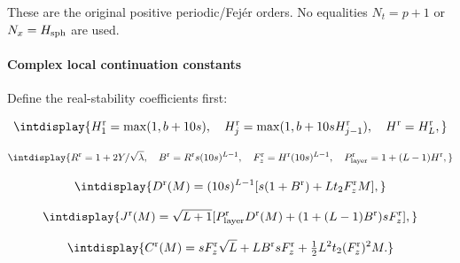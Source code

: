 
These are the original positive periodic/Fejér orders. No equalities \(N_t=p+1\) or \(N_x=H_{\rm sph}\) are used.


\paragraph{Complex local continuation constants}
\label{int:setup-orders-detail-7}
\mbox{}\par\smallskip


Define the real-stability coefficients first:


\begingroup\renewcommand{\theHequation}{intdisplay.251}
\begin{equation*}
\intdisplay{
H_1^{\rm r}=\max(1,b+10s),\quad
H_j^{\rm r}=\max(1,b+10sH_{j-1}^{\rm r}),\quad H^{\rm r}=H_L^{\rm r},
}
\end{equation*}
\endgroup

\begingroup\renewcommand{\theHequation}{intdisplay.252}
\begin{equation*}
\intdisplay{
R^{\rm r}=1+2Y/\sqrt\lambda,\quad
B^{\rm r}=R^{\rm r}s(10s)^{L-1},\quad
F_z^{\rm r}=H^{\rm r}(10s)^{L-1},\quad
P_{\rm layer}^{\rm r}=1+(L-1)H^{\rm r},
}
\end{equation*}
\endgroup

\begingroup\renewcommand{\theHequation}{intdisplay.253}
\begin{equation*}
\intdisplay{
D^{\rm r}(M)=(10s)^{L-1}
 [s(1+B^{\rm r})+Lt_2F_z^{\rm r}M],
}
\end{equation*}
\endgroup

\begingroup\renewcommand{\theHequation}{intdisplay.254}
\begin{equation*}
\intdisplay{
J^{\rm r}(M)=\sqrt{L+1}
 [P_{\rm layer}^{\rm r}D^{\rm r}(M)
                  +(1+(L-1)B^{\rm r})sF_z^{\rm r}],
}
\end{equation*}
\endgroup

\begingroup\renewcommand{\theHequation}{intdisplay.255}
\begin{equation*}
\intdisplay{
C^{\rm r}(M)=sF_z^{\rm r}\sqrt L+LB^{\rm r}sF_z^{\rm r}
                       +\tfrac12L^2t_2(F_z^{\rm r})^2M.
}
\end{equation*}
\endgroup

